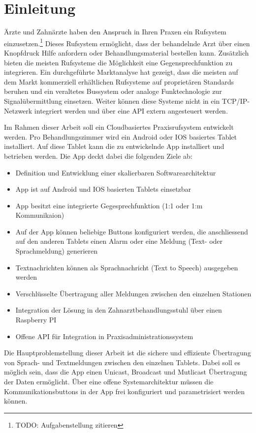 \section{Einleitung}

Ärzte und Zahnärzte haben den Anspruch in Ihren Praxen ein Rufsystem einzusetzen.\footnote{TODO: Aufgabenstellung zitieren}
Dieses Rufsystem ermöglicht, dass der behandelnde Arzt über einen Knopfdruck Hilfe anfordern oder Behandlungsmaterial bestellen kann.
Zusätzlich bieten die meisten Rufsysteme die Möglichkeit eine Gegensprechfunktion zu integrieren.
Ein durchgeführte Marktanalyse hat gezeigt, dass die meisten auf dem Markt kommerziell erhältlichen Rufsysteme auf proprietären Standards beruhen und ein veraltetes Bussystem oder analoge Funktechnologie zur Signalübermittlung einsetzen.
Weiter können diese Systeme nicht in ein TCP/IP-Netzwerk integriert werden und über eine API extern angesteuert werden.

Im Rahmen dieser Arbeit soll ein Cloudbasiertes Praxisrufsystem entwickelt werden.
Pro Behandlungszimmer wird ein Android oder IOS basiertes Tablet installiert.
Auf diese Tablet kann die zu entwickelnde App installiert und betrieben werden.
Die App deckt dabei die folgenden Ziele ab:

\begin{itemize}
    \item Definition und Entwicklung einer skalierbaren Softwarearchitektur
    \item App ist auf Android und IOS basierten Tablets einsetzbar
    \item App besitzt eine integrierte Gegesprechfunktion (1:1 oder 1:m Kommunikaion)
    \item Auf der App können beliebige Buttons konfiguriert werden, die anschliessend auf den anderen Tablets einen Alarm oder eine Meldung (Text- oder Sprachmeldung) generieren
    \item Textnachrichten können als Sprachnachricht (Text to Speech) ausgegeben werden
    \item Verschlüsselte Übertragung aller Meldungen zwischen den einzelnen Stationen
    \item Integration der Lösung in den Zahnarztbehandlungsstuhl über einen Raspberry PI
    \item Offene API für Integration in Praxisadministrationssystem
\end{itemize}

Die Hauptproblemstellung dieser Arbeit ist die sichere und effiziente Übertragung von Sprach- und Textmeldungen zwischen den einzelnen Tablets.
Dabei soll es möglich sein, dass die App einen Unicast, Broadcast und Mutlicast Übertragung der Daten ermöglicht.
Über eine offene Systemarchitektur müssen die Kommunikationsbuttons in der App frei konfiguriert und parametrisiert werden können.

